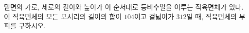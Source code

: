 밑면의 가로, 세로의 길이와 높이가 이 순서대로 등비수열을 이루는 직육면체가 있다. 이 직육면체의 모든 모서리의 길이의 합이 $104$이고 겉넓이가 $312$일 때, 직육면체의 부피를 구하시오.
